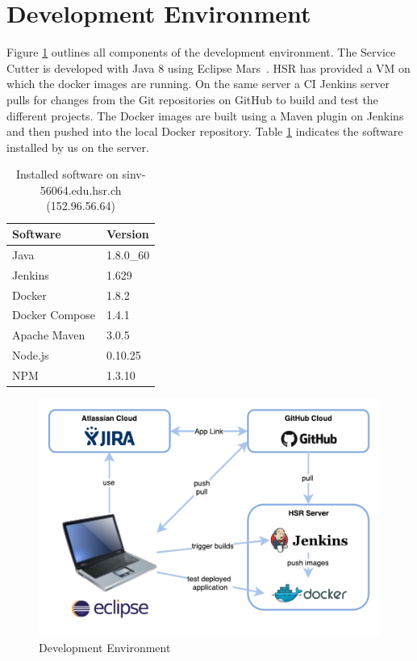 \section{Development Environment}

Figure \ref{fig:devenvironment} outlines all components of the development environment. The Service Cutter is developed with Java 8 using Eclipse Mars~\cite{eclipsemars}. \gls{HSR} has provided a \gls{VM} on which the \gls{docker} images are running. On the same server a \gls{CI} Jenkins server pulls for changes from the Git repositories on GitHub to build and test the different projects. The Docker images are built using a Maven plugin on Jenkins and then pushed into the local Docker repository. Table \ref{tab:vm} indicates the software installed by us on the server.


\begin{table}[H]
\begin{tabular}
{|p{100pt} p{80pt}|}
\hline \textbf{Software} & \textbf{Version} \\ 
\hline Java & 1.8.0\_60 \\ 
\hline Jenkins & 1.629 \\ 
\hline Docker & 1.8.2 \\ 
\hline Docker Compose & 1.4.1 \\
\hline Apache Maven & 3.0.5 \\
\hline Node.js & 0.10.25 \\
\hline NPM & 1.3.10 \\
\hline 
\end{tabular} 
\caption{Installed software on sinv-56064.edu.hsr.ch (152.96.56.64)}
\label{tab:vm}
\end{table}

\begin{figure}[H]
	\includegraphics[scale=1]{diagrams/DevelopmentEnvironment.pdf}
	\caption{Development Environment}
	\label{fig:devenvironment}
\end{figure}
